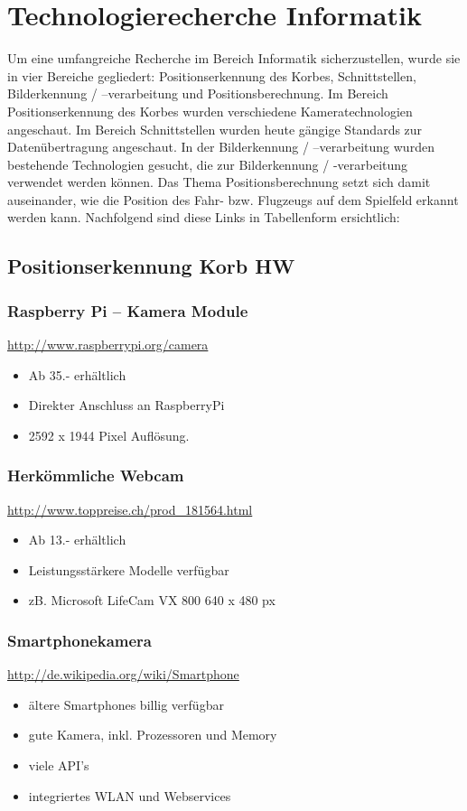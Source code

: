 \section{Technologierecherche Informatik}
Um eine umfangreiche Recherche im Bereich Informatik sicherzustellen, wurde 
sie in vier Bereiche gegliedert: Positionserkennung des Korbes, 
Schnittstellen, Bilderkennung / –verarbeitung und Positionsberechnung. Im 
Bereich Positionserkennung des Korbes wurden verschiedene Kameratechnologien 
angeschaut. Im Bereich Schnittstellen wurden heute gängige Standards zur 
Datenübertragung angeschaut. In der Bilderkennung / –verarbeitung wurden 
bestehende Technologien gesucht, die zur Bilderkennung / -verarbeitung 
verwendet werden können. Das Thema Positionsberechnung setzt sich damit 
auseinander, wie die Position des Fahr- bzw. Flugzeugs auf dem Spielfeld 
erkannt werden kann. Nachfolgend sind diese Links in Tabellenform ersichtlich:

\subsection{Positionserkennung Korb HW}

\subsubsection{Raspberry Pi – Kamera Module}
\url{http://www.raspberrypi.org/camera} \\
\begin{itemize}
    \item Ab 35.- erhältlich
    \item Direkter Anschluss an RaspberryPi
    \item 2592 x 1944 Pixel Auflösung.
\end{itemize}

\subsubsection{Herkömmliche Webcam}
\url{http://www.toppreise.ch/prod_181564.html}
\begin{itemize}
    \item Ab 13.- erhältlich
    \item Leistungsstärkere Modelle verfügbar
    \item zB. Microsoft LifeCam VX 800 640 x 480 px
\end{itemize}

\subsubsection{Smartphonekamera}
\url{http://de.wikipedia.org/wiki/Smartphone}
\begin{itemize}
    \item ältere Smartphones billig verfügbar
    \item gute Kamera, inkl. Prozessoren und Memory
    \item viele API’s
    \item integriertes WLAN und Webservices
\end{itemize}

